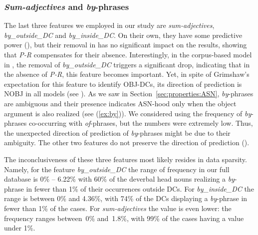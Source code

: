 \documentclass[output=paper]{langsci/langscibook}
\begin{document}
\subsubsection{\textit{Sum-adjectives} and \textit{by}-phrases}\label{sec:discussion-int-by}
The last three features we employed in our study are \textit{sum-adjectives},  \textit{by\_outside\_DC} and  \textit{by\_inside\_DC}. On their own, they have some predictive power (),  {but their removal in  has no significant impact on the results, showing that \textit{P-R} compensates for their absence. Interestingly, in the corpus-based model in  , the removal of \textit{by\_outside\_DC} triggers a significant drop, indicating that in the absence of \textit{P-R}, this feature becomes important. Yet, in spite of Grimshaw's expectation for this feature to identify OBJ-DCs, its direction of prediction is NOBJ in all models (see ). As we saw in Section~\ref{sec:properties:ASN}, \textit{by}-phrases are ambiguous and their presence indicates ASN-hood only when the object argument is also realized (see (\ref{ex:by})). We considered using the frequency of  \textit{by}-phrases co-occurring with \textit{of}-phrases, but the numbers were extremely low. Thus, the unexpected direction of prediction of \textit{by}-phrases might be due to their ambiguity. The other two features do not preserve the direction of prediction ().}



The inconclusiveness of these three features most likely resides in data sparsity. Namely, for the feature {\textit{by\_outside\_DC}} the range of frequency in our full database is 0\% -- 6.22\% with 60\% of the deverbal head nouns realizing a \textit{by}-phrase in fewer than 1\% of their occurrences outside DCs. For \textit{by\_inside\_DC} the range is between 0\% and 4.36\%, with 74\% of the DCs displaying a \textit{by}-phrase  in fewer than 1\% of the cases. For \textit{sum-adjectives} the value is even lower: the frequency ranges between~0\% and~1.8\%, with 99\% of the cases having a value under 1\%. 
\end{document}
